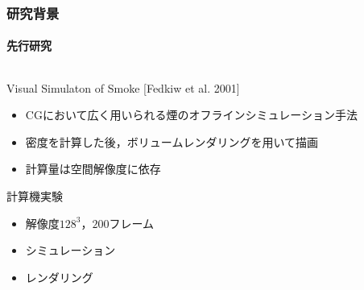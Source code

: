 \documentclass[aspectratio=169,dvipdfmx,hyperref={bookmarks=true}]{beamer}
\begin{document}
\begin{frame}
 \frametitle{研究背景}
   \framesubtitle{先行研究}
\begin{columns}[T]
	\begin{column}{0.6\linewidth}
	\begin{block}{Visual Simulaton of Smoke [Fedkiw et al. 2001]}
		\begin{itemize}
		\item CGにおいて広く用いられる煙のオフラインシミュレーション手法
		\item 密度を計算した後，ボリュームレンダリングを用いて描画
		\item 計算量は空間解像度に依存
	\end{itemize}
	\end{block}
	
	\begin{block}{計算機実験}
	\begin{itemize}
	\item 解像度$128^3$，$200$フレーム
	\item シミュレーション
	\item レンダリング
	\end{itemize}
	\end{block}
    	\end{column}
	\begin{column}{0.4\linewidth}
    	\end{column}
    \end{columns}
 \end{frame}
  
\end{document}

